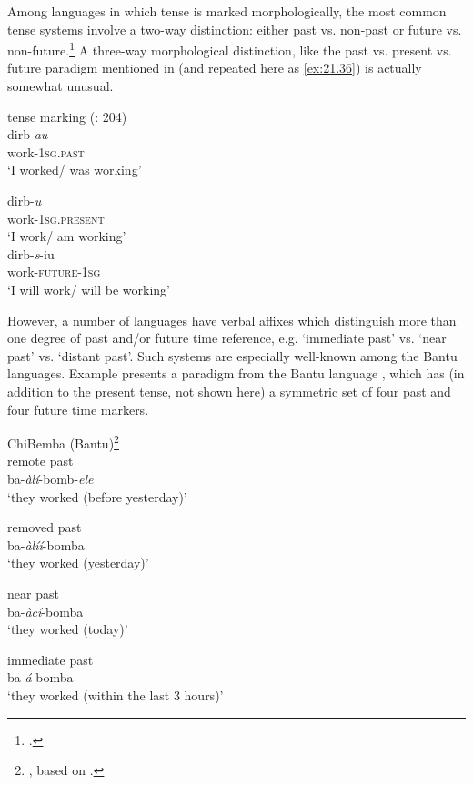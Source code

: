 Among languages in which tense is marked morphologically, the most common tense systems involve a two-way distinction: either past vs. non-past or future vs. non-future.\footnote{\citet{ChungTimberlake1985}.} A three-way morphological distinction, like the  past vs. present vs. future paradigm mentioned in  (and repeated here as \ref{ex:21.36}) is actually somewhat unusual.


\ea \label{ex:21.36}
{ tense marking} (\citealt{ChungTimberlake1985}: 204)\\
\ea  
\gll dirb-\textit{au}\\
work-\textsc{1sg}\textsc{.past} \\
\glt ‘I worked/ was working’

\ex
\gll dirb-\textit{u}\\
work-\textsc{1sg}\textsc{.present} \\
\glt ‘I work/ am working’\\

\ex
\gll dirb-\textit{s}-iu\\
work-\textsc{future}-\textsc{1sg} \\
\glt ‘I will work/ will be working’
\z
\z

However, a number of languages have verbal affixes which distinguish more than one degree of past and/or future time reference, e.g. ‘immediate past’ vs. ‘near past’ vs. ‘distant past’. Such systems are especially well-known among the  {Bantu} languages. Example  presents a paradigm from the {Bantu} language , which has (in addition to the present tense, not shown here) a symmetric set of four past and four future time markers.

\ea \label{ex:21.37}
{ChiBemba ({Bantu})}\footnote{\citet[208]{ChungTimberlake1985}, based on \citet{Givón1972}.} \\
\ea  remote past\\
    ba-\textit{àlí}-bomb-\textit{ele}   \\
\glt‘they worked (before yesterday)’

\ex removed past\\
     ba-\textit{àlíí}-bomba   \\
\glt‘they worked (yesterday)’

\ex near past \\
    ba-\textit{àcí}-bomba   \\
\glt‘they worked (today)’

\ex immediate past \\
   ba-\textit{á}-bomba   \\
\glt‘they worked (within the last 3 hours)’

